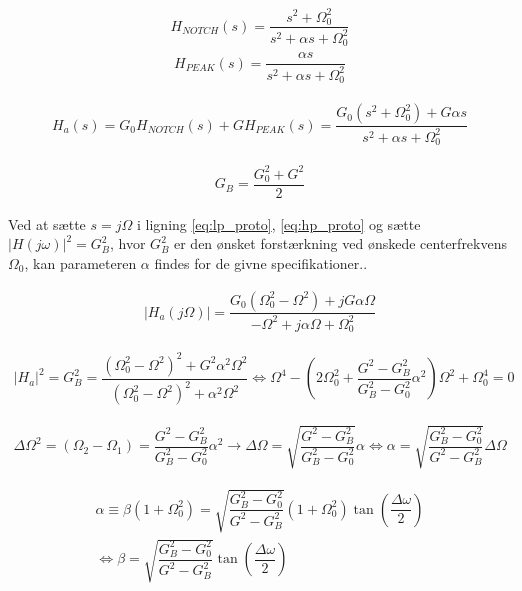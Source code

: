      \begin{align}
     H_{NOTCH}(s) = \dfrac{s^2 + \Omega_0^2}{s^2 + \alpha s + \Omega_0^2}
     \label{eq:lp_proto}
    \end{align}
    \begin{align}
      H_{PEAK} (s) = \dfrac{\alpha s}{s^2 + \alpha s + \Omega_0^2}  
    \end{align}

     \begin{align}
     H_a (s) = G_0 H_{NOTCH} (s) + G H_{PEAK} (s) = \dfrac{G_0 (s^2 + \Omega_0^2) + G \alpha s}{s^2 + \alpha s + \Omega_0^2}
     \label{eq:hp_proto}
    \end{align}

    \begin{align}
        G_B = \dfrac{G_0^2 + G^2}{2} \label{eq:gain_b}
    \end{align}

    Ved at sætte $s = j \Omega$ i ligning \ref{eq:lp_proto}, \ref{eq:hp_proto}
    og sætte $\big| H(j\omega)\big|^2 = G_B^2$, hvor $G_B^2$ er den ønsket forstærkning
    ved ønskede centerfrekvens $\Omega_0$, kan parameteren $\alpha$ findes for de givne specifikationer.. 
    
    \begin{align}
     |H_{a}(j \Omega)| = \dfrac{G_0 (\Omega_0^2- \Omega^2)+ j G \alpha \Omega}{-\Omega^2 + j \alpha \Omega + \Omega_0^2}   
    \end{align}

    \begin{align}
        |H_{a}|^2 = G_B^2 =  \dfrac{(\Omega_0^2- \Omega^2)^2 + G^2 \alpha^2 \Omega^2}{(\Omega_0^2-\Omega^2)^2 +\alpha^2 \Omega^2}   \iff \Omega^4 - \left(2 \Omega_0^2 + \dfrac{G^2- G_B^2}{G_B^2- G_0^2} \alpha^2 \right) \Omega^2 + \Omega_0^4 =0
    \end{align}
    
    
    \begin{align}
       \Delta \Omega^2 = (\Omega_2 - \Omega_1 ) = \dfrac{G^2 - G_B^2}{G_B^2 - G_0^2}  \alpha^2 \rightarrow \Delta \Omega = \sqrt{\dfrac{G^2 - G_B^2}{G_B^2 - G_0^2}} \alpha \iff \alpha = \sqrt{\dfrac{G_B^2-G_0^2}{G^2 - G_B^2 }} \Delta \Omega
    \end{align}


    \begin{align}
    \alpha \equiv \beta (1 + \Omega_0^2)  = \sqrt{\dfrac{G_B^2-G_0^2}{G^2 - G_B^2 }} \left( 1 + \Omega_0^2 \right) \tan \left( \dfrac{\Delta \omega}{2} \right) \\
    \iff \beta = \sqrt{\dfrac{G_B^2-G_0^2}{G^2 - G_B^2 }} \tan \left( \dfrac{\Delta \omega}{2} \right) \label{eq:beta}
    \end{align}


